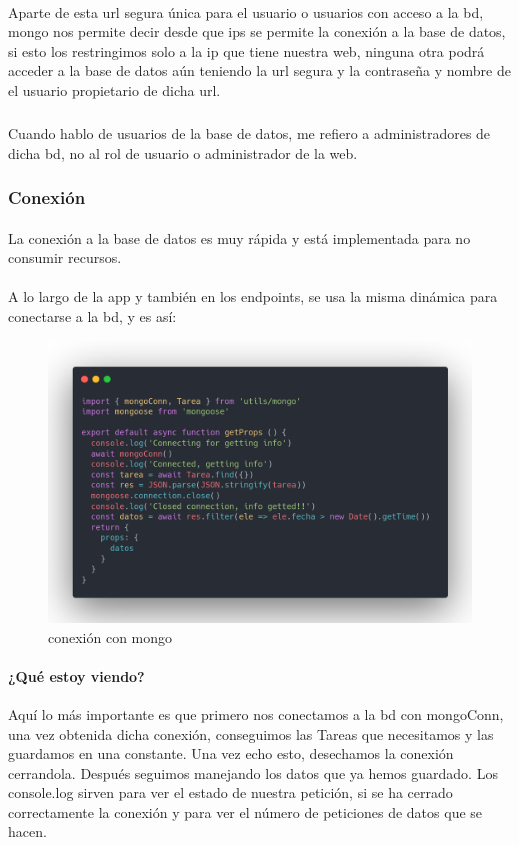 \documentclass[a4paper]{article}
\begin{document}
   \paragraph{}
   Aparte de esta url segura única para el usuario o usuarios con acceso a la 
   bd, mongo nos permite decir desde que ips se permite la conexión a la base 
   de datos, si esto los restringimos solo a la ip que tiene nuestra web, ninguna
   otra podrá acceder a la base de datos aún teniendo la url segura y la contraseña 
   y nombre de el usuario propietario de dicha url.
   \subparagraph{}
   Cuando hablo de usuarios de la base de datos, me refiero a administradores 
   de dicha bd, no al rol de usuario o administrador de la web.
\subsubsection{Conexión}
\paragraph{}
La conexión a la base de datos es muy rápida y está implementada 
para no consumir recursos.
\paragraph{}
A lo largo de la app y también en los endpoints, se usa la misma 
dinámica para conectarse a la bd, y es así:
\begin{figure}[ht]
   \includegraphics[width=\linewidth]{./assets/mongo.png}
   \centering
   \caption{conexión con mongo}
   \label{fig:mongo}
\end{figure}
\paragraph{¿Qué estoy viendo?}
Aquí lo más importante es que primero nos conectamos a la bd con mongoConn,
una vez obtenida dicha conexión, conseguimos las Tareas que necesitamos y 
las guardamos en una constante. Una vez echo esto, desechamos la conexión cerrandola.
Después seguimos manejando los datos que ya hemos guardado. Los console.log 
sirven para ver el estado de nuestra petición, si se ha cerrado correctamente 
la conexión y para ver el número de peticiones de datos que se hacen.
 
\end{document}
